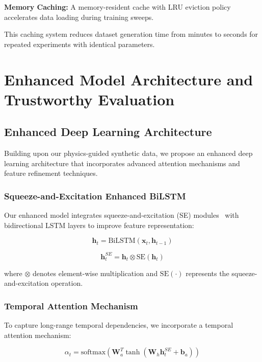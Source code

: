 \documentclass[journal]{IEEEtran}
\begin{document}
\textbf{Memory Caching:} A memory-resident cache with LRU eviction policy accelerates data loading during training sweeps.

This caching system reduces dataset generation time from minutes to seconds for repeated experiments with identical parameters.

\section{Enhanced Model Architecture and Trustworthy Evaluation}

\subsection{Enhanced Deep Learning Architecture}

Building upon our physics-guided synthetic data, we propose an enhanced deep learning architecture that incorporates advanced attention mechanisms and feature refinement techniques.

\subsubsection{Squeeze-and-Excitation Enhanced BiLSTM}

Our enhanced model integrates squeeze-and-excitation (SE) modules~\cite{se_networks2018} with bidirectional LSTM layers to improve feature representation:

\begin{equation}
\mathbf{h}_t = \text{BiLSTM}(\mathbf{x}_t, \mathbf{h}_{t-1})
\end{equation}

\begin{equation}
\mathbf{h}_t^{SE} = \mathbf{h}_t \otimes \text{SE}(\mathbf{h}_t)
\end{equation}

where $\otimes$ denotes element-wise multiplication and $\text{SE}(\cdot)$ represents the squeeze-and-excitation operation.

\subsubsection{Temporal Attention Mechanism}

To capture long-range temporal dependencies, we incorporate a temporal attention mechanism:

\begin{equation}
\alpha_t = \text{softmax}(\mathbf{W}_a^T \tanh(\mathbf{W}_h \mathbf{h}_t^{SE} + \mathbf{b}_a))
\end{equation}
\end{document}
